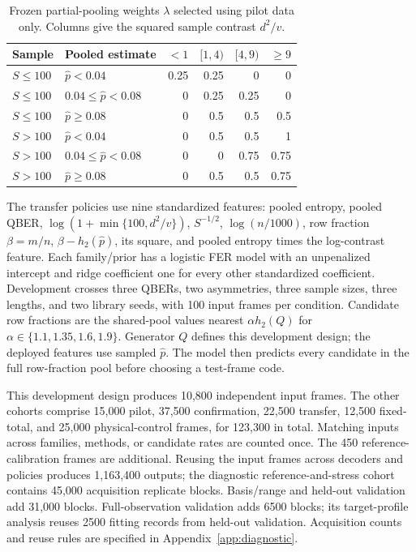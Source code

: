 \begin{table}[!htbp]
\centering
\small\setlength{\tabcolsep}{4pt}
\caption{Frozen partial-pooling weights $\lambda$ selected using pilot data only. Columns give the squared sample contrast $d^2/v$.}
\label{tab:rule}
\begin{tabular}{@{}llrrrr@{}}
\toprule
Sample & Pooled estimate & $<1$ & $[1,4)$ & $[4,9)$ & $\geq9$ \\
\midrule
$S\leq100$ & $\widehat p<0.04$ & 0.25 & 0.25 & 0 & 0 \\
$S\leq100$ & $0.04\leq\widehat p<0.08$ & 0 & 0.25 & 0.25 & 0 \\
$S\leq100$ & $\widehat p\geq0.08$ & 0 & 0.5 & 0.5 & 0.5 \\
$S>100$ & $\widehat p<0.04$ & 0 & 0.5 & 0.5 & 1 \\
$S>100$ & $0.04\leq\widehat p<0.08$ & 0 & 0 & 0.75 & 0.75 \\
$S>100$ & $\widehat p\geq0.08$ & 0 & 0.5 & 0.5 & 0.75 \\
\bottomrule
\end{tabular}
\end{table}

The transfer policies use nine standardized features: pooled entropy, pooled QBER,
$\log(1+\min\{100,d^2/v\})$, $S^{-1/2}$, $\log(n/1000)$, row fraction
$\beta=m/n$, $\beta-h_2(\widehat p)$, its square, and pooled entropy times the
log-contrast feature. Each family/prior has a logistic FER model with an unpenalized
intercept and ridge coefficient one for every other standardized coefficient.
Development crosses three QBERs, two asymmetries, three sample sizes, three lengths,
and two library seeds, with 100 input frames per condition. Candidate row fractions
are the shared-pool values nearest $\alpha h_2(Q)$ for
$\alpha\in\{1.1,1.35,1.6,1.9\}$. Generator $Q$ defines this development design;
the deployed features use sampled $\widehat p$. The model then predicts every
candidate in the full row-fraction pool before choosing a test-frame code.

This development design produces 10,800 independent input frames. The other cohorts
comprise 15,000 pilot, 37,500 confirmation, 22,500 transfer,
12,500 fixed-total, and 25,000 physical-control frames, for 123,300 in total.
Matching inputs across families, methods, or candidate rates are counted once.
The 450 reference-calibration frames are additional. Reusing the input frames across
decoders and policies produces 1,163,400 outputs; the diagnostic reference-and-stress cohort
contains 45,000 acquisition replicate blocks. Basis/range and held-out validation
add 31,000 blocks. Full-observation validation adds 6500 blocks; its target-profile
analysis reuses 2500 fitting records from held-out validation. Acquisition counts
and reuse rules are specified in Appendix~\ref{app:diagnostic}.

